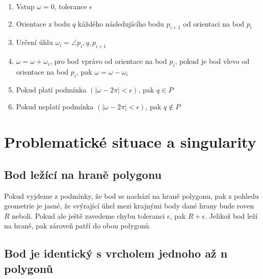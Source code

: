 \documentclass{article}
\begin{document}
\begin{enumerate} 

\item Vstup $\omega = 0$, tolerance $\epsilon$

\item Orientace z bodu $q$ káždého následujícího bodu  $p_{i+1}$ od orientaci na bod $p_i$

\item Určení úhlu $\omega_i = \angle p_i, q, p_{i+1}$ 

\item  $\omega = \omega + \omega_i$, pro bod vprávo od orientace na bod $p_i$, pokud je bod vlevo od orientace na bod $p_i$, pak $\omega = \omega - \omega_i$

\item Pokud platí podmínka $(\left|\omega - 2\pi \right| < \epsilon)$, pak $q \in P$

\item Pokud neplatí podmínka  $(\left|\omega - 2\pi \right| < \epsilon)$, pak $q \notin P$

\end{enumerate} 
\clearpage
\newpage
\section{Problematické situace a singularity} %
\subsection{Bod ležící na hraně polygonu} 

\bigskip 

Pokud vyjdeme z podmínky, že bod se nachází na hraně polygonu, pak z pohledu geometrie je jasné, že svýrající úhel mezi krajnými body dané hrany bude roven $R$ neboli. Pokud ale ještě zavedeme chybu toleranci $\epsilon$, pak $R+\epsilon$. Jelikož bod leží na hraně, pak zároveň patří do obou polygonů.

\subsection{Bod je identický s vrcholem jednoho až n polygonů} 

\bigskip 
\end{document}
